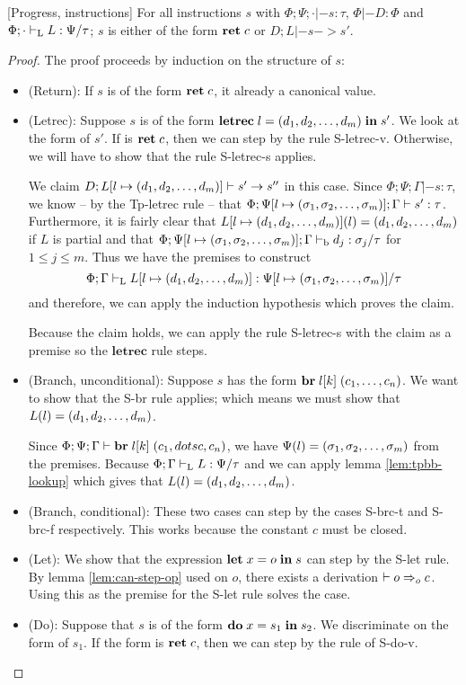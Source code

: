 \documentclass[a4paper, oneside, 10pt, draft]{memoir}
\begin{document}
\begin{lem}{[Progress, instructions]}
  \label{lem:progress-instructions}
  For all instructions $s$ with $\Phi;\Psi;\cdot |- s : \tau$, $\Phi
  |- D : \Phi$ and $\Phi;\cdot |-_{\mathrm{L}} L : \Psi / \tau$; $s$ is either
  of the form $\mathbf{ret} \; c$ or $D;L |- s -> s'$.
\end{lem}
\begin{proof}
  The proof proceeds by induction on the structure of $s$:
  \begin{itemize}
  \item (Return): If $s$ is of the form $\mathbf{ret} \; c$, it already a
    canonical value.
  \item (Letrec): Suppose $s$ is of the form
    $\mathbf{letrec} \; l = (d_1, d_2, \dotsc, d_m) \; \mathbf{in} \; s'$. We look at the form of $s'$. If is
    $\mathbf{ret} \; c$, then we can step by the rule S-letrec-v. Otherwise, we
    will have to show that the rule S-letrec-s applies.

    We claim $D;L[l \mapsto (d_1, d_2, \dotsc, d_m)] |- s' -> s''$ in this
    case. Since $\Phi;\Psi;\Gamma |- s : \tau$, we know -- by the
    Tp-letrec rule -- that $\Phi;\Psi[l \mapsto (\sigma_1, \sigma_2, \dotsc, \sigma_m)];\Gamma |- s'
    : \tau$. Furthermore, it is fairly clear that $L[l \mapsto
    (d_1, d_2, \dotsc, d_m)](l) = (d_1, d_2, \dotsc, d_m)$ if $L$ is partial and that $\Phi;\Psi[l
    \mapsto (\sigma_1, \sigma_2, \dotsc, \sigma_m)];\Gamma |-_{\mathrm{b}} d_j : \sigma_j / \tau$ for $1 \leq j
    \leq m$. Thus we have the premises to construct
    \begin{equation*}
      \Phi;\Gamma |-_{\mathrm{L}} L[l \mapsto (d_1, d_2, \dotsc, d_m)] : \Psi[l \mapsto (\sigma_1, \sigma_2, \dotsc, \sigma_m)] / \tau
    \end{equation*}
    and therefore, we can apply the induction hypothesis which proves the claim.

    Because the claim holds, we can apply the rule S-letrec-s with the
    claim as a premise so the $\mathbf{letrec}$ rule steps.
  \item (Branch, unconditional): Suppose $s$ has the form $\mathbf{br} \; l[k] \; (c_1, \dotsc,
      c_n)$. We want to show that the S-br rule applies; which means
    we must show that $L(l) = (d_1, d_2, \dotsc, d_m)$.

    Since $\Phi;\Psi;\Gamma |- \mathbf{br} \; l[k] \; (c_1, dotsc, c_n)$, we have
    $\Psi(l) = (\sigma_1, \sigma_2, \dotsc, \sigma_m)$ from the premises. Because $\Phi;\Gamma |-_{\mathrm{L}}
    L : \Psi / \tau$ and we can apply lemma
    \ref{lem:tpbb-lookup} which gives that $L(l) = (d_1, d_2, \dotsc, d_m)$.

  \item (Branch, conditional): These two cases can step by the cases
    S-brc-t and S-brc-f respectively. This works because the constant
    $c$ must be closed.
  \item (Let): We show that the expression $\mathbf{let} \; x = o \; \mathbf{in} \; s$ can step
    by the S-let rule. By lemma \ref{lem:can-step-op} used on $o$,
    there exists a derivation $|- o =>_{o} c$. Using this as the premise
    for the S-let rule solves the case.
  \item (Do): Suppose that $s$ is of the form $\mathbf{do} \; x = s_1 \; \mathbf{in} \; s_2$. We
    discriminate on the form of $s_1$. If the form is $\mathbf{ret} \; c$, then
    we can step by the rule of S-do-v.


\end{itemize}
\end{proof}
\end{document}
